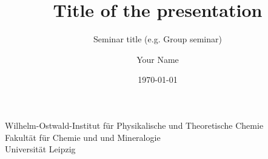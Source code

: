 \title[Short title]{Title of the presentation }
\subtitle[Group seminar]{Seminar title (e.g. Group seminar)} 
\author{Your Name}
\institute
{Wilhelm-Ostwald-Institut f\"ur Physikalische und Theoretische Chemie\\
Fakult\"at f\"ur Chemie und und Mineralogie\\
Universit\"at Leipzig}
\date{\today}



